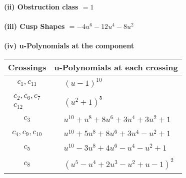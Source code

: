 \documentclass[1p]{elsarticle_modified}
\theoremstyle{definition}
\begin{document}
\flushleft \textbf{(ii) Obstruction class $= 1$}\\~\\
\flushleft \textbf{(iii) Cusp Shapes $= -4 u^6-12 u^4-8 u^2$}\\~\\
\newpage\renewcommand{\arraystretch}{1}
\flushleft \textbf{(iv) u-Polynomials at the component}\newline \\
\begin{tabular}{m{50pt}|m{274pt}}
Crossings & \hspace{64pt}u-Polynomials at each crossing \\
\hline $$\begin{aligned}c_{1},c_{11}\end{aligned}$$&$\begin{aligned}
&(u-1)^{10}
\end{aligned}$\\
\hline $$\begin{aligned}c_{2},c_{6},c_{7}\\c_{12}\end{aligned}$$&$\begin{aligned}
&(u^2+1)^5
\end{aligned}$\\
\hline $$\begin{aligned}c_{3}\end{aligned}$$&$\begin{aligned}
&u^{10}+u^8+8 u^6+3 u^4+3 u^2+1
\end{aligned}$\\
\hline $$\begin{aligned}c_{4},c_{9},c_{10}\end{aligned}$$&$\begin{aligned}
&u^{10}+5 u^8+8 u^6+3 u^4- u^2+1
\end{aligned}$\\
\hline $$\begin{aligned}c_{5}\end{aligned}$$&$\begin{aligned}
&u^{10}-3 u^8+4 u^6- u^4- u^2+1
\end{aligned}$\\
\hline $$\begin{aligned}c_{8}\end{aligned}$$&$\begin{aligned}
&(u^5- u^4+2 u^3- u^2+u-1)^2
\end{aligned}$\\
\hline
\end{tabular}\\~\\
\end{document}
